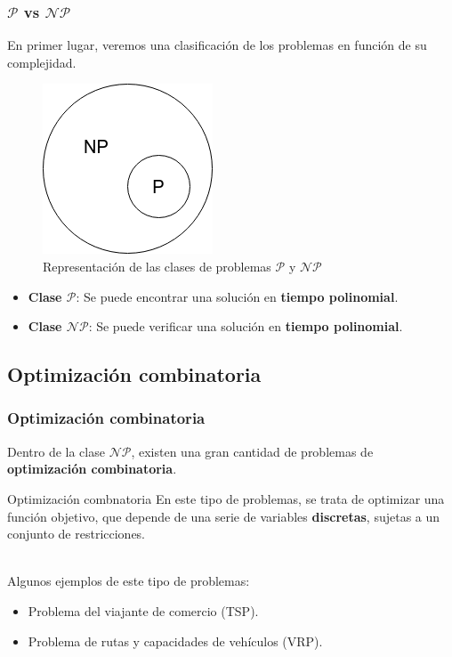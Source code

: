 \documentclass{beamer}
\begin{document}
\begin{frame}
\frametitle{$\mathcal{P}$ vs $\mathcal{NP}$}

En primer lugar, veremos una clasificación de los problemas en función de su complejidad.

\begin{figure}
    \centering
    \includegraphics[scale=0.5]{pres/img/introduccion/p-np.png}
    \caption{Representación de las clases de problemas $\mathcal{P}$ y $\mathcal{NP}$}
    \label{fig:p-np}
\end{figure}

\begin{itemize}
    \item \textbf{Clase $\mathcal{P}$}: Se puede encontrar una solución en \textbf{tiempo polinomial}.
    \item \textbf{Clase $\mathcal{NP}$}: Se puede verificar una solución en \textbf{tiempo polinomial}.
\end{itemize}

\end{frame}

\subsection{Optimización combinatoria}

\begin{frame}
\frametitle{Optimización combinatoria}

Dentro de la clase $\mathcal{NP}$, existen una gran cantidad de problemas de \textbf{optimización combinatoria}. \\

\begin{block}{Optimización combnatoria}
 En este tipo de problemas, se trata de optimizar una función objetivo, que depende de una serie de variables \textbf{discretas}, sujetas a un conjunto de restricciones.
\end{block}
\\
Algunos ejemplos de este tipo de problemas:

\begin{itemize}
    \item Problema del viajante de comercio (TSP).
    \item Problema de rutas y capacidades de vehículos (VRP).
\end{itemize}
\end{frame}
\end{document}
